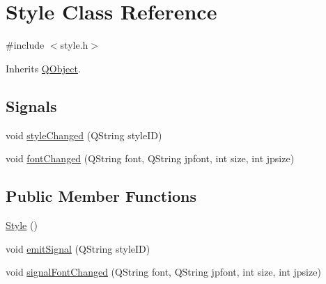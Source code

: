 \hypertarget{class_style}{}\section{Style Class Reference}
\label{class_style}


{\ttfamily \#include $<$style.\+h$>$}



Inherits \hyperlink{class_q_object}{Q\+Object}.

\subsection*{Signals}
\begin{DoxyCompactItemize}
\item 
void \hyperlink{class_style_ae0d0c354818d25e74cabed6d97dd3585}{style\+Changed} (Q\+String style\+ID)
\item 
void \hyperlink{class_style_a2824b7c9634f202278b9e0f593207628}{font\+Changed} (Q\+String font, Q\+String jpfont, int size, int jpsize)
\end{DoxyCompactItemize}
\subsection*{Public Member Functions}
\begin{DoxyCompactItemize}
\item 
\hyperlink{class_style_a914f187818eb30c0cebe3df5378bfa0a}{Style} ()
\item 
void \hyperlink{class_style_aee0ec6a67f69a904c9bea96c83182769}{emit\+Signal} (Q\+String style\+ID)
\item 
void \hyperlink{class_style_a7475ca444e740eb82fbb2e9b9ee9da0b}{signal\+Font\+Changed} (Q\+String font, Q\+String jpfont, int size, int jpsize)
\end{DoxyCompactItemize}
